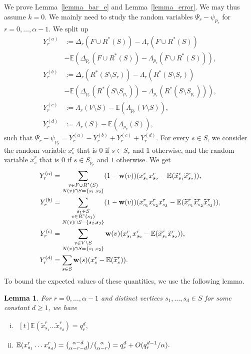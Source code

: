 \documentclass{article}
\theoremstyle{plain}
\theoremstyle{remark}
\theoremstyle{plain}
\newtheorem{lemma}[theorem]{Lemma}
\numberwithin{equation}{section}
\renewcommand{\b}{{\bf{w}}}
\begin{document}
	We prove Lemma~\ref{lemma_bar_e} and Lemma~\ref{lemma_error}. We may thus assume $k=0$. We mainly need to study the random variables $\Psi_r-\psi_{p_r}$ for $r=0,\ldots,\alpha-1$. We split up
	\begin{align}
		Y_r^{(a)}&:=\Delta_r(F\cup R^*(S))-\Lambda_r(F\cup R^*(S))
		\\&-\mathbb{E}(\Delta_{p_r}(F\cup R^*(S))-\Lambda_{p_r}(F\cup R^*(S))),
		\\Y_r^{(b)}&:=\Delta_r(R^*(S\setminus S_r))-\Lambda_r(R^*(S\setminus S_r))
		\\&-\mathbb{E}(\Delta_{p_r}(R^*(S\setminus S_{p_r}))-\Lambda_{p_r}(R^*(S\setminus S_{p_r}))),
		\\Y_r^{(c)}&:=\Lambda_r(V\setminus S)-\mathbb{E}(\Lambda_{p_r}(V\setminus S)),
		\\Y_r^{(d)}&:=\Lambda_r(S)-\mathbb{E}(\Lambda_{p_r}(S)),
	\end{align}
	such that $\Psi_r-\psi_{p_r}=Y_r^{(a)}-Y_r^{(b)}+Y_r^{(c)}+Y_r^{(d)}$. For every $s\in S$, we consider the random variable $x_s^r$ that is $0$ if $s\in S_r$ and $1$ otherwise, and the random variable $\widetilde{x}_s^r$ that is $0$ if $s\in S_{p_r}$ and $1$ otherwise. We get
	\begin{align}
		Y_r^{(a)}&=\sum_{\substack{v\in F\cup R^*(S)\\N(v)\cap S=\{s_1,s_2\}}}(1-\b(v))(x_{s_1}^rx_{s_2}^r-\mathbb{E}(\widetilde{x}_{s_1}^r\widetilde{x}_{s_2}^r)),
		\\Y_r^{(b)}&=\sum_{\substack{s_1\in S\\v\in R^*(s_1)\\N(v)\cap S=\{s_2,s_3\}}}(1-\b(v))(x_{s_1}^rx_{s_2}^rx_{s_3}^r-\mathbb{E}(\widetilde{x}_{s_1}^r\widetilde{x}_{s_2}^r\widetilde{x}_{s_3}^r)),
		\\Y_r^{(c)}&=\sum_{\substack{v\in V\setminus S\\N(v)\cap S=\{s_1,s_2\}}}\b(v)(x_{s_1}^rx_{s_2}^r-\mathbb{E}(\widetilde{x}_{s_1}^r\widetilde{x}_{s_2}^r)),
		\\Y_r^{(d)}&=\sum_{s\in S}\b(s)(x_s^r-\mathbb{E}(\widetilde{x}_s^r)).
	\end{align}
	To bound the expected values of these quantities, we use the following lemma.
	
	\begin{lemma}\label{lemma_x}
		For $r=0,\ldots,\alpha-1$ and distinct vertices $s_1,\ldots,s_d\in S$ for some constant $d\geq1$, we have
		\begin{enumerate}[(i)]
			\item\label{lemma_x_simple} $\begin{aligned}[t]
				\mathbb{E}(\widetilde{x}_{s_1}^r\ldots\widetilde{x}_{s_d}^r)=q_r^d,
			\end{aligned}$
			\item\label{lemma_x_true} $\begin{aligned}[t]
				\mathbb{E}(x_{s_1}^r\ldots x_{s_d}^r)=\tbinom{\alpha-d}{\alpha-r-d}/\tbinom{\alpha}{\alpha-r}=q_r^d+O(q_r^{d-1}/\alpha).
			\end{aligned}$
		\end{enumerate}
	\end{lemma}
	
\end{document}
